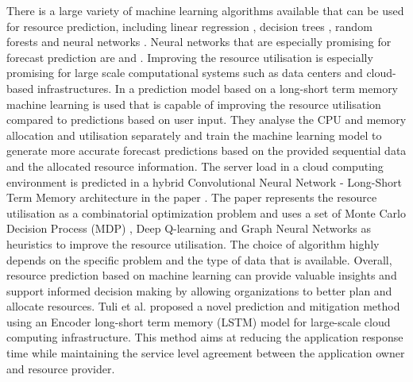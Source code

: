         There is a large variety of machine learning algorithms available that can be used for resource prediction, including linear regression \cite{weisbergAppliedLinearRegression2005}, decision trees \cite{kotsiantisDecisionTreesRecent2013}, random forests \cite{breimanRandomForests2001} and neural networks \cite{andersonIntroductionNeuralNetworks1995}.
        Neural networks that are especially promising for forecast prediction are  and .
        Improving the resource utilisation is especially promising for large scale computational systems such as data centers and cloud-based infrastructures. In \cite{thonglekImprovingResourceUtilization2019} a prediction model based on a long-short term memory machine learning is used that is capable of improving the resource utilisation compared to predictions based on user input.
        They analyse the CPU and memory allocation and utilisation separately and train the machine learning model to generate more accurate forecast predictions based on the provided sequential data and the allocated resource information.
        The server load in a cloud computing environment is predicted in a hybrid Convolutional Neural Network - Long-Short Term Memory architecture in the paper \cite{patelHybridCNNLSTMModel2022}.
        The paper \cite{orenSOLOSearchOnline2021} represents the resource utilisation as a combinatorial optimization problem and uses a set of Monte Carlo Decision Process (MDP) \cite{jamesMonteCarloTheory1980}, Deep Q-learning and Graph Neural Networks as heuristics to improve the resource utilisation.
        The choice of algorithm highly depends on the specific problem and the type of data that is available.
        Overall, resource prediction based on machine learning can provide valuable insights and support informed decision making by allowing organizations to better plan and allocate resources.
        Tuli et al. \cite{tuli2021start} proposed a novel prediction and mitigation method using an Encoder long-short term memory (LSTM) model for large-scale cloud computing infrastructure. This method aims at reducing the application response time while maintaining the service level agreement between the application owner and resource provider.

